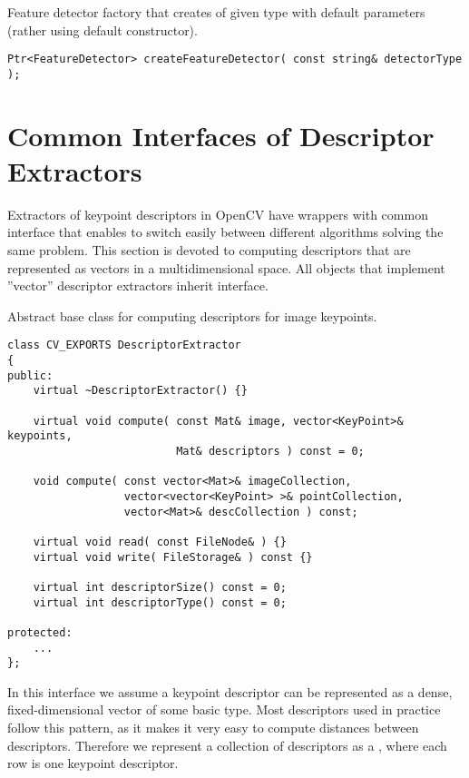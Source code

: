 Feature detector factory that creates  of given type with 
default parameters (rather using default constructor).

\begin{lstlisting}
Ptr<FeatureDetector> createFeatureDetector( const string& detectorType );
\end{lstlisting}

\begin{description}
\end{description}



\section{Common Interfaces of Descriptor Extractors}
Extractors of keypoint descriptors in OpenCV have wrappers with common interface that enables to switch easily 
between different algorithms solving the same problem. This section is devoted to computing descriptors 
that are represented as vectors in a multidimensional space. All objects that implement ''vector'' 
descriptor extractors inherit  interface.

Abstract base class for computing descriptors for image keypoints.

\begin{lstlisting}
class CV_EXPORTS DescriptorExtractor
{
public:
    virtual ~DescriptorExtractor() {}
    
    virtual void compute( const Mat& image, vector<KeyPoint>& keypoints,
                          Mat& descriptors ) const = 0;

    void compute( const vector<Mat>& imageCollection, 
                  vector<vector<KeyPoint> >& pointCollection, 
                  vector<Mat>& descCollection ) const;

    virtual void read( const FileNode& ) {}
    virtual void write( FileStorage& ) const {}

    virtual int descriptorSize() const = 0;
    virtual int descriptorType() const = 0;

protected:
    ...
};
\end{lstlisting}

In this interface we assume a keypoint descriptor can be represented as a
dense, fixed-dimensional vector of some basic type. Most descriptors used
in practice follow this pattern, as it makes it very easy to compute
distances between descriptors. Therefore we represent a collection of
descriptors as a , where each row is one keypoint descriptor.


